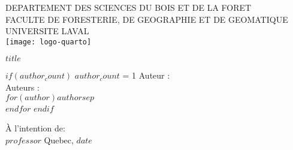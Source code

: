 
\begin{titlepage} 
    \centering
    {\large DEPARTEMENT DES SCIENCES DU BOIS ET DE LA FORET \\}
    {\large FACULTE DE FORESTERIE, DE GEOGRAPHIE ET DE GEOMATIQUE \\}
    {\large UNIVERSITE LAVAL \\}
    {\texttt{[image: logo-quarto]} \\}
    \vspace{2cm}
    {\Huge\bfseries\underline {$title$} \par}
    \vspace{2cm}

    $if(author_count)$
        \ifnum $author_count$ = 1
            {\Large Auteur : \\}
        \else
            {\Large Auteurs : \\}
        \fi
        $for(author)${\large {$author$}}$sep$\\$endfor$
    $endif$

    \vfill
    {\Large À l'intention de: \\ {$professor$}}
    \vfill
    {\large Quebec, {$date$}}
\end{titlepage}
